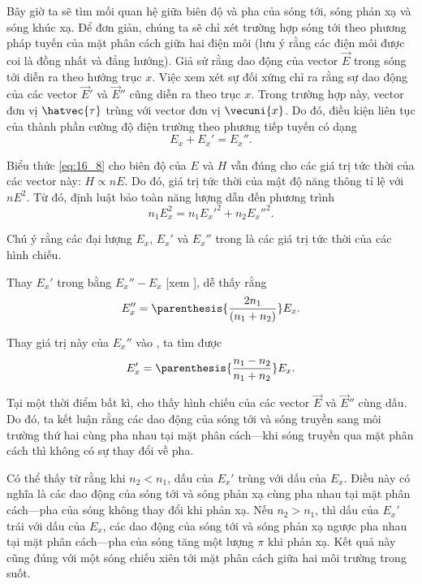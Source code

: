 Bây giờ ta sẽ tìm mối quan hệ giữa biên độ và pha của sóng tới, sóng phản xạ và sóng khúc xạ.
Để đơn giản, chúng ta sẽ chỉ xét trường hợp sóng tới theo phương pháp tuyến của mặt phân cách giữa hai điện môi (lưu ý rằng các điện môi được coi là đồng nhất và đẳng hướng).
Giả sử rằng dao động của vector $\vec{E}$ trong sóng tới diễn ra theo hướng trục $x$.
Việc xem xét sự đối xứng chỉ ra rằng sự dao động của các vector $\vec{E}'$ và $\vec{E}''$ cũng diễn ra theo trục $x$.
Trong trường hợp này, vector đơn vị $\hatvec{\tau}$ trùng với vector đơn vị $\vecuni{x}$.
Do đó, điều kiện liên tục của thành phần cường độ điện trường theo phương tiếp tuyến có dạng
\begin{equation}\label{eq:16_28}
    E_x + E_x' = E_x''.
\end{equation}

Biểu thức \eqref{eq:16_8} cho biên độ của $E$ và $H$ vẫn đúng cho các giá trị tức thời của các vector này: $H \propto nE$.
Do đó, giá trị tức thời của mật độ năng thông tỉ lệ với $nE^2$.
Từ đó, định luật bảo toàn năng lượng dẫn đến phương trình
\begin{equation}\label{eq:16_29}
    n_1 E_x^2 = n_1 E_x'^2 + n_2 E_x''^2.
\end{equation}

\noindent
Chú ý rằng các đại lượng $E_x$, $E_x'$ và $E_x''$ trong  là các giá trị tức thời của các hình chiếu.

Thay $E_x'$ trong  bằng $E_x''-E_x$  [xem ], dễ thấy rằng
\begin{equation}\label{eq:16_30}
    E_x'' = \parenthesis{\frac{2 n_1}{(n_1 + n_2)}} E_x.
\end{equation}

\noindent
Thay giá trị này của $E_x''$ vào , ta tìm được
\begin{equation}\label{eq:16_31}
    E_x' = \parenthesis{\frac{n_1 - n_2}{n_1 + n_2}} E_x.
\end{equation}

Tại một thời điểm bất kì,  cho thấy hình chiếu của các vector $\vec{E}$ và $\vec{E}''$ cùng dấu.
Do đó, ta kết luận rằng các dao động của sóng tới và sóng truyền sang môi trường thứ hai cùng pha nhau tại mặt phân cách---khi sóng truyền qua mặt phân cách thì không có sự thay đổi về pha.

Có thể thấy từ  rằng khi $n_2 < n_1$, dấu của $E_x'$ trùng với dấu của $E_x$.
Điều này có nghĩa là các dao động của sóng tới và sóng phản xạ cùng pha nhau tại mặt phân cách---pha của sóng không thay đổi khi phản xạ.
Nếu $n_2 > n_1$, thì dấu của $E_x'$ trái với dấu của $E_x$, các dao động của sóng tới và sóng phản xạ ngược pha nhau tại mặt phân cách---pha của sóng tăng một lượng $\pi$ khi phản xạ.
Kết quả này cũng đúng với một sóng chiếu xiên tới mặt phân cách giữa hai môi trường trong suốt.

